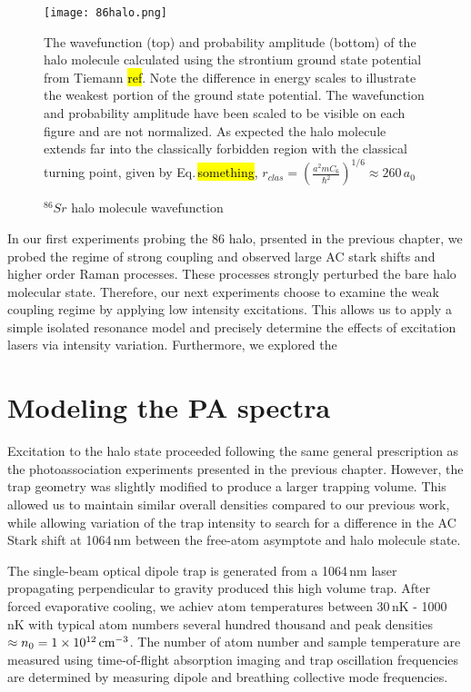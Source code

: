 	\begin{figure} 
	\centerline{
	  \texttt{[image: 86halo.png]}}
	  \caption{$^{86}Sr$ halo molecule wavefunction}{The wavefunction (top) and probability amplitude (bottom) of the halo molecule calculated using the strontium ground state potential from Tiemann \hl{ref}. Note the difference in energy scales to illustrate the weakest portion of the ground state potential. The wavefunction and probability amplitude have been scaled to be visible on each figure and are not normalized. As expected the halo molecule extends far into the classically forbidden region with the classical turning point, given by Eq.\,\hl{something}, $r_{clas} = \left( \frac{a^2 m C_6}{\hbar^2} \right)^{1/6} \approx 260\,a_0$ }
	  \label{fig:86haloWF}
	\end{figure}


	In our first experiments probing the 86 halo, prsented in the previous chapter, we probed the regime of strong coupling and observed large AC stark shifts and higher order Raman processes.
	These processes strongly perturbed the bare halo molecular state.
	Therefore, our next experiments choose to examine the weak coupling regime by applying low intensity excitations.
	This allows us to apply a simple isolated resonance model and precisely determine the effects of excitation lasers via intensity variation.
	Furthermore, we explored the 





\section{Modeling the PA spectra} \label{sec:lowE_theory}
Excitation to the halo state proceeded following the same general prescription as the photoassociation experiments presented in the previous chapter.
However, the trap geometry was slightly modified to produce a larger trapping volume.
This allowed us to maintain similar overall densities compared to our previous work, while allowing variation of the trap intensity to search for a difference in the AC Stark shift at 1064\,nm between the free-atom asymptote and halo molecule state.

The single-beam optical dipole trap is generated from a 1064\,nm laser propagating perpendicular to gravity produced this high volume trap.
After forced evaporative cooling, we achiev atom temperatures between 30\,nK - 1000\,nK with typical atom numbers several hundred thousand and peak densities $\approx n_0 = 1 \times 10^{12} \, \text{cm}^{-3}$. 
The number of atom number and sample temperature are measured using time-of-flight absorption imaging and trap oscillation frequencies are determined by measuring dipole and breathing collective mode frequencies.



